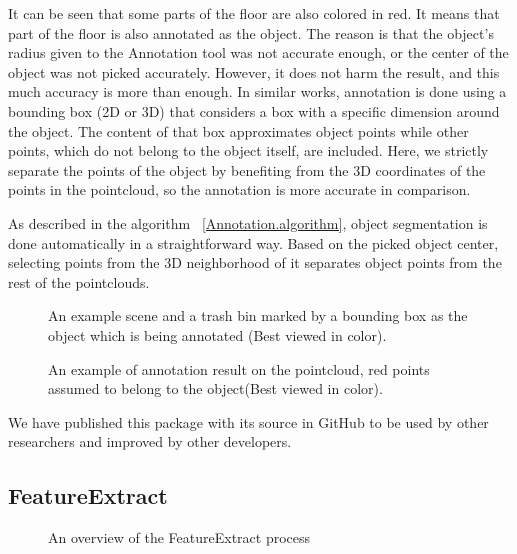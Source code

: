 It can be seen that some parts of the floor are also colored in red. It means that part of the floor is also annotated as the object. The reason is that the object's radius given to the Annotation tool was not accurate enough, or the center of the object was not picked accurately. However, it does not harm the result, and this much accuracy is more than enough. In similar works, annotation is done using a bounding box (2D or 3D) that considers a box with a specific dimension around the object. The content of that box approximates object points while other points, which do not belong to the object itself, are included. Here, we strictly separate the points of the object by benefiting from the 3D coordinates of the points in the 
pointcloud, so the annotation is more accurate in comparison.


As described in the algorithm ~\ref{Annotation.algorithm}, object segmentation is done automatically in a straightforward way. Based on the picked object center, selecting points from the 3D neighborhood of it separates object points from the 
rest of the pointclouds.

\begin{figure}[t]
  \caption[Example scene and object for Annotation tool]
  {An example scene and a trash bin marked by a bounding box as the object which is being annotated (Best viewed in color).}
  \label{TrashbinBounding.figure}
\end{figure}

\begin{figure}[t]
  \caption[Annotation tool result]
  {An example of annotation result on the pointcloud, red points assumed to belong to the object(Best viewed in color).}
  \label{Annotation.figure}
\end{figure}

We have published this package with its source in GitHub to be used by other researchers and improved by other developers.\cite{AnnotationGithub}



\subsection{FeatureExtract}
\label{FeatureExtract.ssec}

\begin{figure}[t]
  \caption[FeatureExtract overview]
  {An overview of the FeatureExtract process}
  \label{FeatureExtractFlowchart.figure}
\end{figure}


